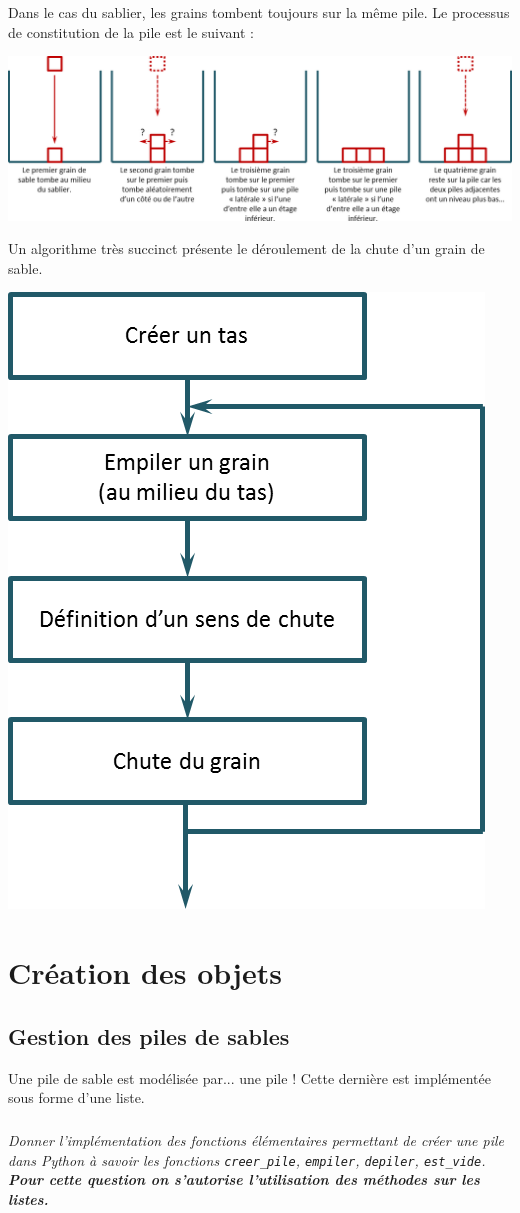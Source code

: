 \documentclass[10pt,fleqn]{article} %
\begin{document}
Dans le cas du sablier, les grains tombent toujours sur la même pile. Le processus de constitution de la pile est le suivant : 
\begin{center}
\includegraphics[width=\linewidth]{images/sablier_02}
\end{center}

Un algorithme très succinct présente le déroulement de la chute d'un grain de sable.
\begin{center}
\includegraphics[width=.4\linewidth]{images/algo}
\end{center}



\section{Création des objets}
\subsection{Gestion des piles de sables}
Une pile de sable est modélisée par... une pile ! Cette dernière est implémentée sous forme d'une liste. 

\subparagraph{}
\textit{Donner l'implémentation des fonctions élémentaires permettant de créer une pile dans Python à savoir les fonctions \texttt{creer\_pile}, \texttt{empiler}, \texttt{depiler}, \texttt{est\_vide}. \textbf{Pour cette question on s'autorise l'utilisation des méthodes sur les listes.}}
\end{document}
